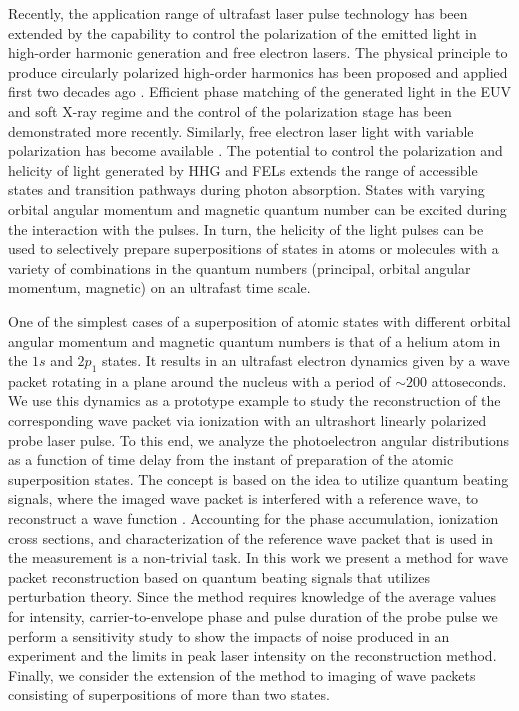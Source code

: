 Recently, the application range of ultrafast laser pulse technology has been extended by the capability to control the polarization of the emitted light in high-order harmonic generation and free electron lasers. The physical principle to produce circularly polarized high-order harmonics has been proposed and applied first two decades ago \cite{eichmann1995}. Efficient phase matching of the generated light in the EUV and soft X-ray regime \cite{fleischer2014,fan2015,hickstein2015} and the control of the polarization stage \cite{huang2018} has been demonstrated more recently. Similarly, free electron laser light with variable polarization has become available \cite{spezzani2011,mazza2014}. The potential to control the polarization and helicity of light generated by HHG and FELs extends the range of accessible states and transition pathways during photon absorption. States with varying orbital angular momentum and magnetic quantum number can be excited during the interaction with the pulses. In turn, the helicity of the light pulses can be used to selectively prepare superpositions of states in atoms or molecules with a variety of combinations in the quantum numbers (principal, orbital angular momentum, magnetic) on an ultrafast time scale. 

One of the simplest cases of a superposition of atomic states with different orbital angular momentum and magnetic quantum numbers is that of a helium atom in the $1s$ and $2p_1$ states. It results in an ultrafast electron dynamics given by a wave packet rotating in a plane around the nucleus with a period of $\sim200$ attoseconds. We use this dynamics as a prototype example to study the reconstruction of the corresponding wave packet via ionization with an ultrashort linearly polarized probe laser pulse.  To this end, we analyze the photoelectron angular distributions as a function of time delay from the instant of preparation of the atomic superposition states. The concept is based on the idea to utilize quantum beating signals, where the imaged wave packet is interfered with a reference wave, to reconstruct a wave function \cite{paul2001,muller2002,Mauritsson2010,klunder2013,priebe2017,jiang2020}. Accounting for the phase accumulation, ionization cross sections, and characterization of the reference wave packet that is used in the measurement is a non-trivial task. In this work we present a method for wave packet reconstruction based on quantum beating signals that utilizes perturbation theory. Since the method requires knowledge of the average values for intensity, carrier-to-envelope phase and pulse duration of the probe pulse we perform a sensitivity study to show the impacts of noise produced in an experiment and the limits in peak laser intensity on the reconstruction method. Finally, we consider the extension of the method to  imaging of wave packets consisting of superpositions of more than two states.

